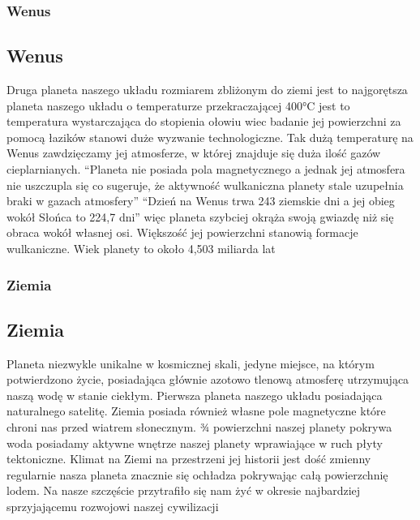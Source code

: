 \begin{frame}
\frametitle{Wenus}
\subsection{Wenus}
Druga planeta naszego układu rozmiarem zbliżonym do ziemi jest to najgorętsza planeta naszego układu o temperaturze przekraczającej 400°C jest to temperatura wystarczająca do stopienia ołowiu wiec badanie jej powierzchni za pomocą łazików stanowi duże wyzwanie technologiczne. Tak dużą temperaturę na Wenus zawdzięczamy jej atmosferze, w której znajduje się duża ilość gazów cieplarnianych. “Planeta nie posiada pola magnetycznego a jednak jej atmosfera nie uszczupla się co sugeruje, że aktywność wulkaniczna planety stale uzupełnia braki w gazach atmosfery” “Dzień na Wenus trwa 243 ziemskie dni a jej obieg wokół Słońca to 224,7 dni” więc planeta szybciej okrąża swoją gwiazdę niż się obraca wokół własnej osi. Większość jej powierzchni stanowią formacje wulkaniczne. Wiek planety to około 4,503 miliarda lat 
\end{frame}

\begin{frame}
\frametitle{Ziemia}
\subsection{Ziemia}
Planeta niezwykle unikalne w kosmicznej skali, jedyne miejsce, na którym potwierdzono życie, posiadająca głównie azotowo tlenową atmosferę utrzymująca naszą wodę w stanie ciekłym. Pierwsza planeta naszego układu posiadająca naturalnego satelitę. Ziemia posiada również własne pole magnetyczne które chroni nas przed wiatrem słonecznym. ¾ powierzchni naszej planety pokrywa woda posiadamy aktywne wnętrze naszej planety wprawiające w ruch płyty tektoniczne. Klimat na Ziemi na przestrzeni jej historii jest dość zmienny regularnie nasza planeta znacznie się ochładza pokrywając całą powierzchnię lodem. Na nasze szczęście przytrafiło się nam żyć w okresie najbardziej sprzyjającemu rozwojowi naszej cywilizacji
\end{frame}


